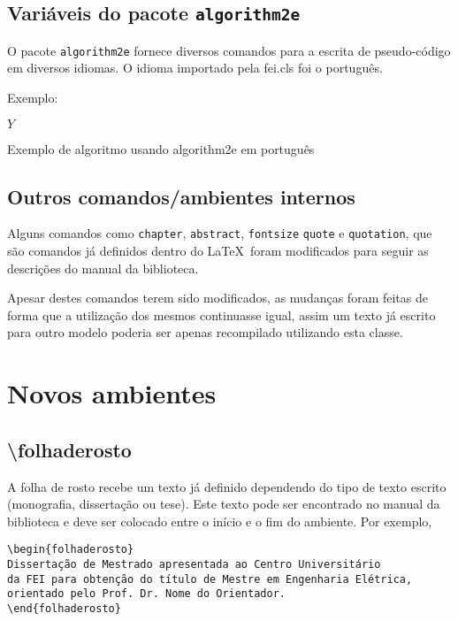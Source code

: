 \documentclass{fei}
\begin{document}
    \subsection{Variáveis do pacote \texttt{algorithm2e}}
    
    O pacote \texttt{algorithm2e} fornece diversos comandos para a escrita de pseudo-código em diversos idiomas. O idioma importado pela fei.cls foi o português.
    
    Exemplo:
    
\begin{algorithm}


\Retorna \(Y\)

\caption{Exemplo de algoritmo usando algorithm2e em português}
\label{lst:alg}
\end{algorithm}
    
    \subsection{Outros comandos/ambientes internos}
    
    Alguns comandos como \texttt{chapter}, \texttt{abstract}, \texttt{fontsize} \texttt{quote} e \texttt{quotation}, que são comandos já definidos dentro do \index{\LaTeX}\LaTeX~foram modificados para seguir as descrições do manual da biblioteca.

    Apesar destes comandos terem sido modificados, as mudanças foram feitas de forma que a utilização dos mesmos continuasse igual, assim um texto já escrito para outro modelo poderia ser apenas recompilado utilizando esta classe.

\section{Novos ambientes}

    \subsection{\textbackslash folhaderosto}
    A folha de rosto recebe um texto já definido dependendo do tipo de texto escrito (monografia, dissertação ou tese). Este texto pode ser encontrado no manual da biblioteca e deve ser colocado entre o início e o fim do ambiente. Por exemplo,
    \begin{verbatim}
\begin{folhaderosto}
Dissertação de Mestrado apresentada ao Centro Universitário
da FEI para obtenção do título de Mestre em Engenharia Elétrica, 
orientado pelo Prof. Dr. Nome do Orientador. 
\end{folhaderosto}
    \end{verbatim}
\end{document}
